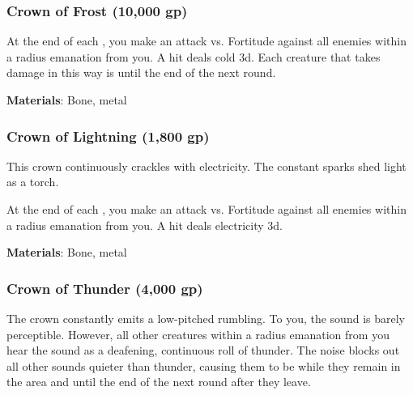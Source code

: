 \lowercase{\hypertarget{item:Crown of Frost}{}}\label{item:Crown of Frost}
\hypertarget{item:Crown of Frost}{\subsubsection{Crown of Frost\hfill{} (10,000 gp)}}

At the end of each , you make an attack vs. Fortitude against all enemies within a \areamed radius emanation from you.
A hit deals cold  \minus3d.
Each creature that takes damage in this way is \fatigued until the end of the next round.



\vspace{0.25em}
\textbf{Materials}: Bone, metal


\lowercase{\hypertarget{item:Crown of Lightning}{}}\label{item:Crown of Lightning}
\hypertarget{item:Crown of Lightning}{\subsubsection{Crown of Lightning\hfill{} (1,800 gp)}}

This crown continuously crackles with electricity.
The constant sparks shed light as a torch.

At the end of each , you make an attack vs. Fortitude against all enemies within a \areamed radius emanation from you.
A hit deals electricity  \minus3d.



\vspace{0.25em}
\textbf{Materials}: Bone, metal


\lowercase{\hypertarget{item:Crown of Thunder}{}}\label{item:Crown of Thunder}
\hypertarget{item:Crown of Thunder}{\subsubsection{Crown of Thunder\hfill{} (4,000 gp)}}

The crown constantly emits a low-pitched rumbling.
To you, the sound is barely perceptible.
However, all other creatures within a \arealarge radius emanation from you hear the sound as a deafening, continuous roll of thunder.
The noise blocks out all other sounds quieter than thunder, causing them to be \deafened while they remain in the area and until the end of the next round after they leave.


